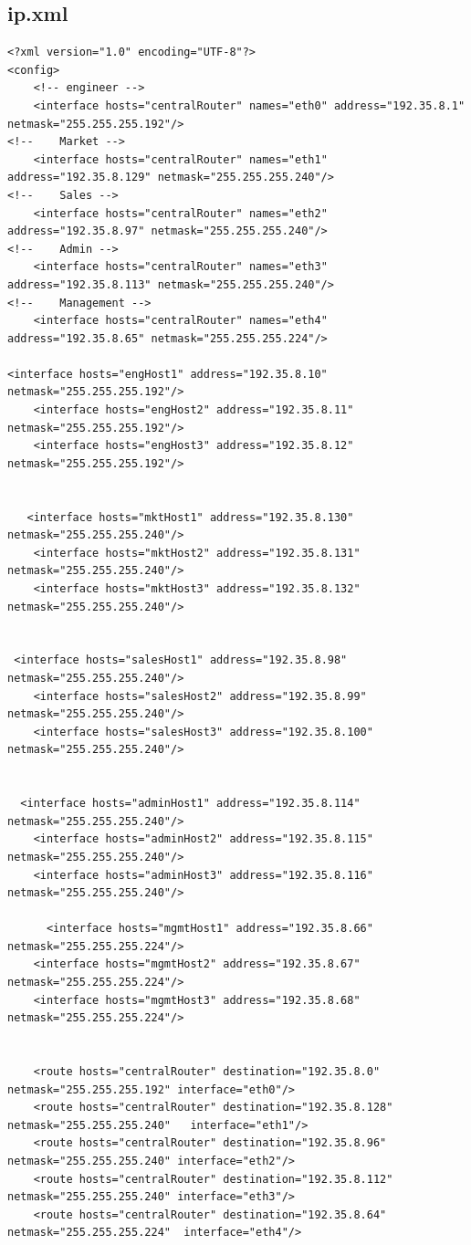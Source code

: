 \documentclass[11pt,a4paper]{article}
\begin{document}
\subsection*{ip.xml}
\begin{lstlisting}[style=labcode]
<?xml version="1.0" encoding="UTF-8"?>
<config>
	<!-- engineer -->
	<interface hosts="centralRouter" names="eth0" address="192.35.8.1" netmask="255.255.255.192"/>
<!-- 	Market -->
	<interface hosts="centralRouter" names="eth1" address="192.35.8.129" netmask="255.255.255.240"/>
<!-- 	Sales -->
	<interface hosts="centralRouter" names="eth2" address="192.35.8.97" netmask="255.255.255.240"/>
<!--  	Admin -->
 	<interface hosts="centralRouter" names="eth3" address="192.35.8.113" netmask="255.255.255.240"/>
<!-- 	Management -->
	<interface hosts="centralRouter" names="eth4" address="192.35.8.65" netmask="255.255.255.224"/>

<interface hosts="engHost1" address="192.35.8.10" netmask="255.255.255.192"/>
    <interface hosts="engHost2" address="192.35.8.11" netmask="255.255.255.192"/>
    <interface hosts="engHost3" address="192.35.8.12" netmask="255.255.255.192"/>
    
    
   <interface hosts="mktHost1" address="192.35.8.130" netmask="255.255.255.240"/>
    <interface hosts="mktHost2" address="192.35.8.131" netmask="255.255.255.240"/>
    <interface hosts="mktHost3" address="192.35.8.132" netmask="255.255.255.240"/>
    
       
 <interface hosts="salesHost1" address="192.35.8.98" netmask="255.255.255.240"/>
    <interface hosts="salesHost2" address="192.35.8.99" netmask="255.255.255.240"/>
    <interface hosts="salesHost3" address="192.35.8.100" netmask="255.255.255.240"/>


  <interface hosts="adminHost1" address="192.35.8.114" netmask="255.255.255.240"/>
    <interface hosts="adminHost2" address="192.35.8.115" netmask="255.255.255.240"/>
    <interface hosts="adminHost3" address="192.35.8.116" netmask="255.255.255.240"/>
    
      <interface hosts="mgmtHost1" address="192.35.8.66" netmask="255.255.255.224"/>
    <interface hosts="mgmtHost2" address="192.35.8.67" netmask="255.255.255.224"/>
    <interface hosts="mgmtHost3" address="192.35.8.68" netmask="255.255.255.224"/>


	<route hosts="centralRouter" destination="192.35.8.0" netmask="255.255.255.192" interface="eth0"/>
    <route hosts="centralRouter" destination="192.35.8.128" netmask="255.255.255.240"   interface="eth1"/>
    <route hosts="centralRouter" destination="192.35.8.96" netmask="255.255.255.240" interface="eth2"/>
    <route hosts="centralRouter" destination="192.35.8.112" netmask="255.255.255.240" interface="eth3"/>
    <route hosts="centralRouter" destination="192.35.8.64" netmask="255.255.255.224"  interface="eth4"/>


\end{lstlisting}
\end{document}
